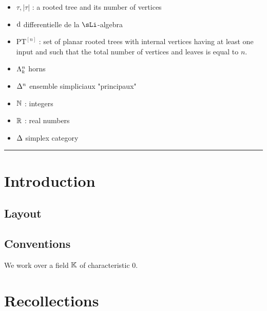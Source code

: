 \documentclass[twoside, 10pt]{amsart}
\begin{document}
\begin{itemize}
\item $\tau, |\tau|$ : a rooted tree and its number of vertices 
\item $\d$ differentielle de la $\sLi$-algebra
\item $\mathrm{PT}^{[n]}$ : set of planar rooted trees with internal vertices having at least one input  and such that the total number of vertices and leaves is equal to $n$. 
\item $\Ho{k}{n}$ horns 
\item $\De{n}$ ensemble simpliciaux "principaux"
\item $\NN$ : integers
\item $\RR$ : real numbers 
\item $\cD$ simplex category
\end{itemize}
\hrule



\section*{Introduction}

%
%


\subsection*{Layout}

\subsection*{Conventions}\leavevmode


We work over a field $\k$ of characteristic $0$. 



\section{Recollections \bruno{[Bruno]}}
\end{document}
